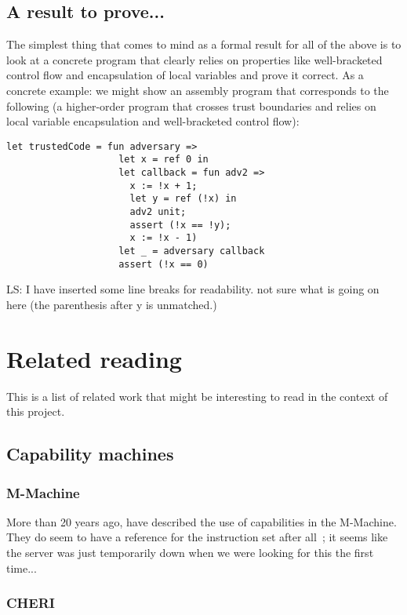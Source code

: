 \documentclass[a4paper]{article}
\newcommand\lau[1]{{\color{purple} \sf \footnotesize {LS: #1}}\\}
\begin{document}
\subsection{A result to prove...}
\label{sec:os-less-stack-property}

The simplest thing that comes to mind as a formal result for all of the above is
to look at a concrete program that clearly relies on properties like
well-bracketed control flow and encapsulation of local variables and prove it
correct. As a concrete example: we might show an assembly program that
corresponds to the following (a higher-order program that crosses trust
boundaries and relies on local variable encapsulation and well-bracketed control
flow):
\begin{verbatim}
let trustedCode = fun adversary =>
                    let x = ref 0 in
                    let callback = fun adv2 => 
                      x := !x + 1; 
                      let y = ref (!x) in 
                      adv2 unit; 
                      assert (!x == !y); 
                      x := !x - 1)
                    let _ = adversary callback
                    assert (!x == 0)
\end{verbatim}
\lau{I have inserted some line breaks for readability. not sure what is going on here (the parenthesis after y is unmatched.)}
\section{Related reading}
\label{sec:related-reading}

This is a list of related work that might be interesting to read in the context
of this project.

\subsection{Capability machines}
\label{sec:rw-cap-machines}

\subsubsection{M-Machine}
More than 20 years ago, \cite{Carter:1994:HSF:195473.195579} have described the
use of capabilities in the M-Machine. They do seem to have a reference for the
instruction set after all~\citep{Dally1997Memo59}; it seems like the server was
just temporarily down when we were looking for this the first time...

\subsubsection{CHERI}
\end{document}
